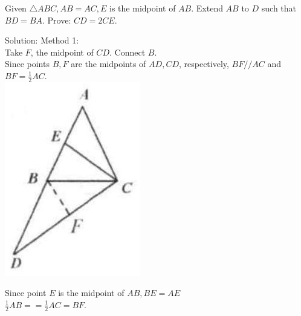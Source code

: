 \documentclass{article}
\begin{document}
Given \(\triangle A B C, A B=A C, E\) is the midpoint of \(A B\). Extend \(A B\) to \(D\) such that \(B D=B A\). Prove: \(C D=2 C E\).

Solution:
Method 1:\\
Take \(F\), the midpoint of \(C D\). Connect \(B\).\\
Since points \(B, F\) are the midpoints of \(A D, C D\), respectively, \(B F / / A C\) and \(B F=\frac{1}{2} A C\).\\
\centering
\includegraphics[width=\textwidth]{images/039.jpg}

Since point \(E\) is the midpoint of \(A B, B E=A E\)\\
\(\frac{1}{2} A B==\frac{1}{2} A C=B F\).
\end{document}
